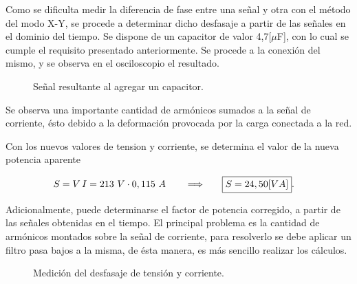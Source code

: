           Como se dificulta medir la diferencia de fase entre una señal y otra con el método del modo X-Y,
          se procede a determinar dicho desfasaje a partir de las señales en el dominio del tiempo. 
          Se dispone de un capacitor de valor 4,7[$\mu$F], con lo cual se cumple el requisito presentado
          anteriormente. Se procede a la conexión del mismo, y se observa en el osciloscopio el resultado.
        
        \begin{figure}[H]
          \centering
          \caption{Señal resultante al agregar un capacitor.}
          \label{fig: Señal_Correccion}
        \end{figure}

        Se observa una importante cantidad de armónicos sumados a la señal de corriente, ésto debido
        a la deformación provocada por la carga conectada a la red.

         Con los nuevos valores de tension y corriente, se determina el valor de la nueva potencia 
         aparente

        \begin{align*}
          S = V\,I  = 213~V \cdot 0,115\ A \hspace{20pt} \Longrightarrow \hspace{20pt} \Aboxed{S = 24,50 [VA]}.
        \end{align*}

          Adicionalmente, puede determinarse el factor de potencia corregido, a partir de las señales
          obtenidas en el tiempo. El principal problema es la cantidad de armónicos montados sobre 
          la señal de corriente, para resolverlo se debe aplicar un filtro pasa bajos a la misma, de
         ésta manera, es más sencillo realizar los cálculos.

        \begin{figure}[H]
          \centering
          \caption{Medición del desfasaje de tensión y corriente.}
          \label{fig: Desfasaje tensión-corriente.}
        \end{figure}  

